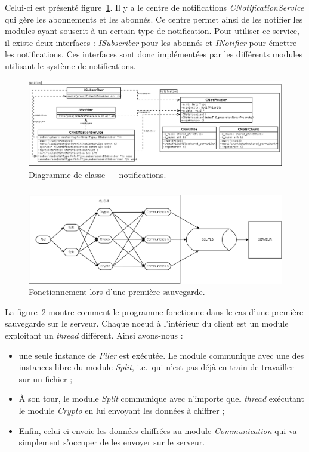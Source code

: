 \documentclass[a4paper,10pt, twoside]{report}
\begin{document}
\begin{spacing}{1.2}
Celui-ci est présenté figure~\ref{classDiagramNotif}. Il y a le centre de
notifications \textit{CNotificationService} qui gère les abonnements et les
abonnés. Ce centre permet ainsi de les notifier les modules ayant souscrit à
un certain type de notification. Pour utiliser ce service, il existe deux
interfaces : \textit{ISubscriber} pour les abonnés et \textit{INotifier} pour
émettre les notifications. Ces interfaces sont donc implémentées par les
différents modules utilisant le système de notifications.

\begin{figure}[h!]
  \hspace{-4.5em}
  \includegraphics[width=19cm]{softwareDesign/classDiagramNotif.png}
  \caption{\label{classDiagramNotif} Diagramme de classe --- notifications.}
\end{figure}

\subparagraph{}
\begin{figure}[h!]
  \hspace{-1.5em}
  \includegraphics[width=17cm]{softwareDesign/moduleInteraction.png}
  \caption{\label{interactModule} Fonctionnement lors d'une première
  sauvegarde.}
\end{figure}

La figure~\ref{interactModule} montre comment le programme fonctionne dans le
cas d'une première sauvegarde sur le serveur. Chaque noeud à l'intérieur
du client est un module exploitant un \textit{thread} différent. Ainsi
avons-nous :

\begin{itemize}
 \item une seule instance de \textit{Filer} est exécutée. Le module
 communique avec une des instances libre du module \textit{Split}, i.e.~qui
 n'est pas déjà en train de travailler sur un fichier ;
 \item À son tour, le module \textit{Split} communique avec n'importe quel
 \textit{thread} exécutant le module \textit{Crypto} en lui envoyant les
 données à chiffrer ;
 \item Enfin, celui-ci envoie les données chiffrées au module
 \textit{Communication} qui va simplement s'occuper de les envoyer sur le
 serveur.
\end{itemize}


\end{spacing}
\end{document}
